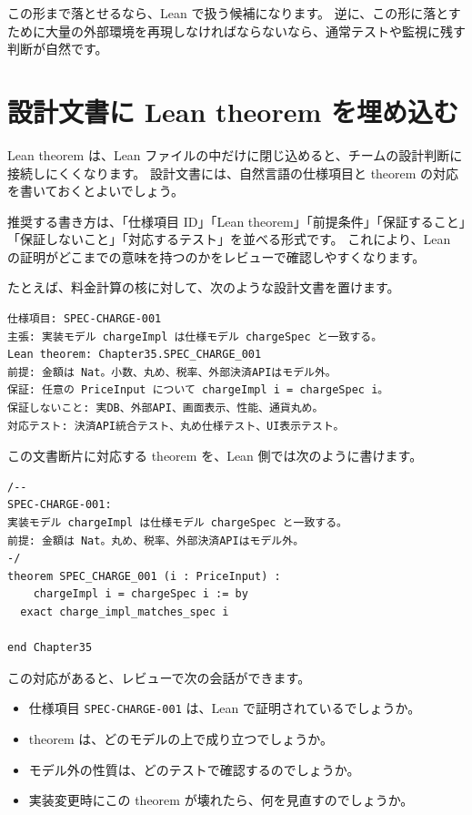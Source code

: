 この形まで落とせるなら、Lean で扱う候補になります。
逆に、この形に落とすために大量の外部環境を再現しなければならないなら、通常テストや監視に残す判断が自然です。

\section{設計文書に Lean theorem を埋め込む}

Lean theorem は、Lean ファイルの中だけに閉じ込めると、チームの設計判断に接続しにくくなります。
設計文書には、自然言語の仕様項目と theorem の対応を書いておくとよいでしょう。

推奨する書き方は、「仕様項目 ID」「Lean theorem」「前提条件」「保証すること」「保証しないこと」「対応するテスト」を並べる形式です。
これにより、Lean の証明がどこまでの意味を持つのかをレビューで確認しやすくなります。

たとえば、料金計算の核に対して、次のような設計文書を置けます。

\begin{listing}[htbp]
\begin{verbatim}
仕様項目: SPEC-CHARGE-001
主張: 実装モデル chargeImpl は仕様モデル chargeSpec と一致する。
Lean theorem: Chapter35.SPEC_CHARGE_001
前提: 金額は Nat。小数、丸め、税率、外部決済APIはモデル外。
保証: 任意の PriceInput について chargeImpl i = chargeSpec i。
保証しないこと: 実DB、外部API、画面表示、性能、通貨丸め。
対応テスト: 決済API統合テスト、丸め仕様テスト、UI表示テスト。
\end{verbatim}
\caption{\texttt{SPEC-CHARGE-001} 対応表}
\label{lst:ch35-design-doc-fragment}
\end{listing}

この文書断片に対応する theorem を、Lean 側では次のように書けます。

\begin{listing}[htbp]
\begin{verbatim}
/--
SPEC-CHARGE-001:
実装モデル chargeImpl は仕様モデル chargeSpec と一致する。
前提: 金額は Nat。丸め、税率、外部決済APIはモデル外。
-/
theorem SPEC_CHARGE_001 (i : PriceInput) :
    chargeImpl i = chargeSpec i := by
  exact charge_impl_matches_spec i

end Chapter35
\end{verbatim}
\caption{\texttt{SPEC\_CHARGE\_001}}
\label{lst:ch35-spec-charge-001}
\end{listing}

この対応があると、レビューで次の会話ができます。

\begin{itemize}
\item 仕様項目 \texttt{SPEC-CHARGE-001} は、Lean で証明されているでしょうか。
\item theorem は、どのモデルの上で成り立つでしょうか。
\item モデル外の性質は、どのテストで確認するのでしょうか。
\item 実装変更時にこの theorem が壊れたら、何を見直すのでしょうか。
\end{itemize}

